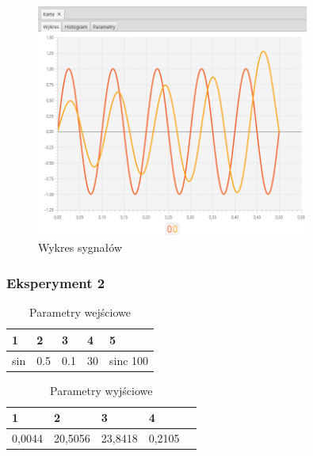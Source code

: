 \documentclass[12pt]{article}
\begin{document}
{{{                \begin{figure}[H]
                    \centering
                    \includegraphics[width=0.8\textwidth]{img/result/experiment1/01/data_draw_original_chart_recon_output_130101.png}
                    \caption{Wykres sygnałów}
                \end{figure}
            }
            \newpage

            \subsubsection{Eksperyment 2} {
                \begin{table}[H]
                    \centering
                    \begin{tabular}{|l|l|l|l|l|}
                        \hline
                        1 & 2 & 3 & 4 & 5   \\ \hline
                        sin & 0.5 & 0.1 & 30 & sinc 100    \\ \hline
                    \end{tabular}
                    \caption{Parametry wejściowe}
                \end{table}

                \begin{table}[H]
                    \centering
                    \begin{tabular}{|l|l|l|l|l|}
                        \hline
                        1 & 2 & 3 & 4   \\ \hline
                        0,0044 & 20,5056 & 23,8418 & 0,2105  \\ \hline
                    \end{tabular}
                    \caption{Parametry wyjściowe}
                \end{table}


}}}
\end{document}
